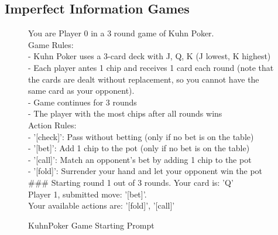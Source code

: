 \newpage

\subsection{Imperfect Information Games}


\begin{figure}[H]
\centering

\begin{tcolorbox}[
    colback=blue!5!white,
    colframe=blue!40!white,
    left=0.8mm, right=0.8mm, top=0.8mm, bottom=0.8mm,
    boxsep=0.8mm,
    width=\textwidth,
    enhanced,
    breakable,
    attach boxed title to top center={yshift=-2mm},
    boxed title style={colback=blue!40!white},
    title={KuhnPoker Game Starting Prompt},
    fontupper=\footnotesize,
    fonttitle=\footnotesize,
    label=box:KuhnPoker
]
You are Player 0 in a 3 round game of Kuhn Poker.\\
Game Rules:\\
- Kuhn Poker uses a 3-card deck with J, Q, K (J lowest, K highest)\\
- Each player antes 1 chip and receives 1 card each round (note that the cards are dealt without replacement, so you cannot have the same card as your opponent).\\
- Game continues for 3 rounds\\
- The player with the most chips after all rounds wins\\
Action Rules:\\
- '[check]': Pass without betting (only if no bet is on the table)\\
- '[bet]': Add 1 chip to the pot (only if no bet is on the table)\\
- '[call]': Match an opponent's bet by adding 1 chip to the pot\\
- '[fold]': Surrender your hand and let your opponent win the pot\\
\#\#\# Starting round 1 out of 3 rounds. Your card is: 'Q'\\
Player 1, submitted move: '[bet]'.\\
Your available actions are: '[fold]', '[call]'\\
\end{tcolorbox}

\caption{KuhnPoker Game Starting Prompt} \label{box:KuhnPoker}
\end{figure}


